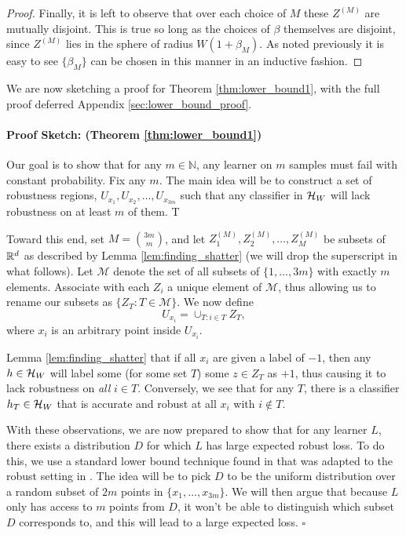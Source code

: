 \begin{proof}
Finally, it is left to observe that over each choice of $M$ these $Z^{(M)}$ are mutually disjoint. This is true so long as the choices of $\beta$ themselves are disjoint, since $Z^{(M)}$ lies in the sphere of radius $W(1+\beta_M)$. As noted previously it is easy to see $\{\beta_M\}$ can be chosen in this manner in an inductive fashion.
\end{proof}

We are now sketching a proof for Theorem \ref{thm:lower_bound1}, with the full proof deferred Appendix \ref{sec:lower_bound_proof}.

\paragraph{Proof Sketch: (Theorem \ref{thm:lower_bound1})} 

Our goal is to show that for any $m \in \mathbb{N}$, any learner on $m$ samples must fail with constant probability. Fix any $m$. The main idea will be to construct a set of robustness regions, $U_{x_1}, U_{x_2}, \dots, U_{x_{3m}}$ such that any classifier in $\mathcal H_W$ will lack robustness on at least $m$ of them.  T

Toward this end, set $M = \binom{3m}{m}$, and let $Z^{(M)}_1, Z^{(M)}_2, \dots, Z^{(M)}_M$ be subsets of $\mathbb{R}^d$ as described by Lemma \ref{lem:finding_shatter} (we will drop the superscript in what follows). Let $\mathcal{M}$ denote the set of all subsets of $\{1, \dots, 3m\}$ with exactly $m$ elements. Associate with each $Z_i$ a unique element of $\mathcal{M}$, thus allowing us to rename our subsets as $\{Z_T: T \in \mathcal{M}\}.$ We now define $$U_{x_i} = \cup_{T: i \in T} Z_T,$$ where $x_i$ is an arbitrary point inside $U_{x_i}$.

Lemma \ref{lem:finding_shatter} that if all $x_i$ are given a label of $-1$, then any $h \in \mathcal H_W$ will label some (for some set $T$) some $z \in Z_T$ as $+1$, thus causing it to lack robustness on \textit{all} $i \in T$. Conversely, we see that for any $T$, there is a classifier $h_T \in \mathcal H_W$ that is accurate and robust at all $x_i$ with $i \notin T$. 


With these observations, we are now prepared to show that for any learner $L$, there exists a distribution $D$ for which $L$ has large expected robust loss. To do this, we use a standard lower bound technique found in \cite{ml_book} that was adapted to the robust setting in \cite{Srebro19}. The idea will be to pick $D$ to be the uniform distribution over a random subset of $2m$ points in $\{x_1, \dots, x_{3m}\}$. We will then argue that because $L$ only has access to $m$ points from $D$, it won't be able to distinguish which subset $D$ corresponds to, and this will lead to a large expected loss. $\square$

